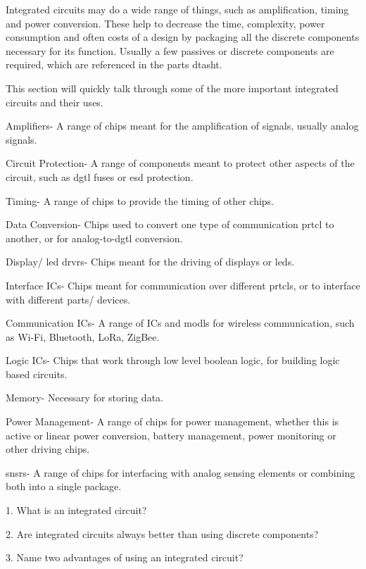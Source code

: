 \documentclass[a4paper,11pt]{report}
\newcommand{\Quiz}[1] %
{
\par\noindent %
\phantomsection %
\todo[inline, color=blue!30]{\textbf{#1}} %
\vspace{1em} %
}
\begin{document}
Integrated circuits may do a wide range of things, such as amplification, timing and power conversion. These help to decrease the time, complexity, power consumption and often costs of a design by packaging all the discrete components necessary for its function. Usually a few passives or discrete components are required, which are referenced in the parts \gls{dtasht}.

This section will quickly talk through some of the more important integrated circuits and their uses.

Amplifiers- A range of chips meant for the amplification of signals, usually analog signals.

Circuit Protection- A range of components meant to protect other aspects of the circuit, such as \gls{dgtl} fuses or \gls{esd} protection.

Timing- A range of chips to provide the timing of other chips.

Data Conversion- Chips used to convert one type of communication \gls{prtcl} to another, or for analog-to-\gls{dgtl} conversion.

Display/ \gls{led} \gls{drvr}s- Chips meant for the driving of displays or \gls{led}s.

Interface ICs- Chips meant for communication over different \gls{prtcl}s, or to interface with different parts/ devices.

Communication ICs- A range of ICs and \gls{modl}s for wireless communication, such as Wi-Fi, Bluetooth, LoRa, ZigBee.

Logic ICs- Chips that work through low level boolean logic, for building logic based circuits.

Memory- Necessary for storing data.

Power Management- A range of chips for power management, whether this is active or linear power conversion, battery management, power monitoring or other driving chips.

\gls{snsr}s- A range of chips for interfacing with analog sensing elements or combining both into a single package.

\Quiz{Quiz}

1. What is an integrated circuit?

2. Are integrated circuits always better than using discrete components?

3. Name two advantages of using an integrated circuit?

\vspace*{1\baselineskip}
\end{document}
